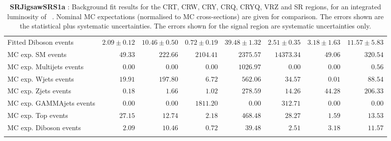 \begin{table}
\begin{center}
{\begin{tabular*}{\textwidth}{@{\extracolsep{\fill}}lrrrrrrr}
        Fitted Diboson events         & $2.09 \pm 0.12$          & $10.46 \pm 0.50$          & $0.72 \pm 0.19$          & $39.48 \pm 1.32$          & $2.51 \pm 0.35$          & $3.18 \pm 1.63$          & $11.57 \pm 5.83$              \\
 \noalign{\smallskip}\hline\noalign{\smallskip}
MC exp. SM events              & $49.33$          & $222.66$          & $2104.41$          & $2375.57$          & $14373.34$          & $49.06$          & $320.54$              \\
\noalign{\smallskip}\hline\noalign{\smallskip}
        MC exp. Multijets events         & $0.00$          & $0.00$          & $0.00$          & $1026.97$          & $0.00$          & $0.00$          & $0.56$              \\
        MC exp. Wjets events         & $19.91$          & $197.80$          & $6.72$          & $562.06$          & $34.57$          & $0.01$          & $88.54$              \\
        MC exp. Zjets events         & $0.18$          & $1.66$          & $1.02$          & $278.59$          & $14.26$          & $44.28$          & $206.33$              \\
        MC exp. GAMMAjets events         & $0.00$          & $0.00$          & $1811.20$          & $0.00$          & $312.71$          & $0.00$          & $0.00$              \\
        MC exp. Top events         & $27.15$          & $12.74$          & $2.18$          & $468.48$          & $28.27$          & $1.59$          & $13.53$              \\
        MC exp. Diboson events         & $2.09$          & $10.46$          & $0.72$          & $39.48$          & $2.51$          & $3.18$          & $11.57$              \\
\noalign{\smallskip}\hline\noalign{\smallskip}
\end{tabular*}
}
\end{center}
\caption{{\bf SRJigsawSRS1a} : Background fit results for the CRT, CRW, CRY, CRQ, CRYQ, VRZ and SR regions, for an integrated luminosity of \ourintlumi~\ifb. Nominal MC expectations (normalised to MC cross-sections) are given for comparison. The errors shown are the statistical plus systematic uncertainties. The errors shown for the signal region are systematic uncertainties only.}
\label{table.results.systematics.in.logL.fit.CRT.CRW.CRY.CRQ.CRYQ.VRZ.SR.SRJigsawSRS1a}
\end{table}
%